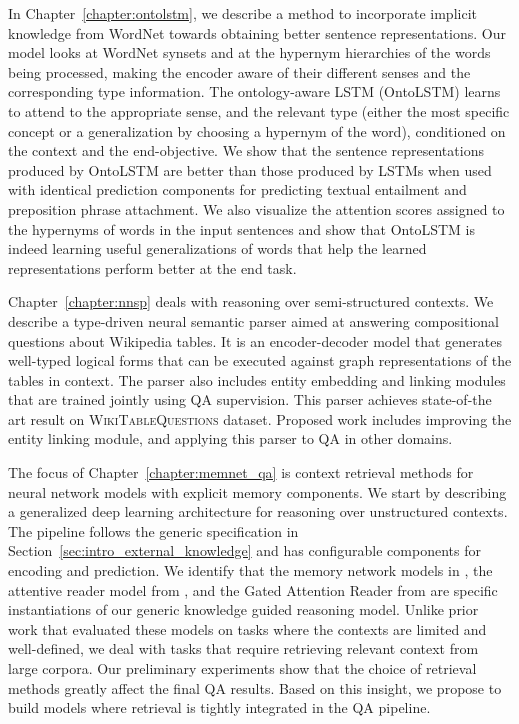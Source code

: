 In Chapter~\ref{chapter:ontolstm}, we describe a method to incorporate implicit knowledge
from WordNet towards obtaining better sentence representations. Our model looks at WordNet synsets
and at the hypernym hierarchies of the words being processed, making the 
encoder aware of their different senses and the corresponding type information.
The ontology-aware LSTM (OntoLSTM) learns to attend to the appropriate sense,
and the relevant type 
(either the most specific concept or a generalization by choosing a hypernym of
the word), conditioned on the context and the end-objective. We show that the sentence representations 
produced by OntoLSTM are better than those produced by LSTMs when used with identical prediction 
components for predicting textual entailment and preposition phrase attachment. We also visualize the attention scores assigned to the hypernyms 
of words in the input sentences and show that OntoLSTM is indeed learning useful generalizations of words
that help the learned representations perform better at the end task.

Chapter~\ref{chapter:nnsp} deals with reasoning over semi-structured contexts. We describe a type-driven
neural semantic parser aimed at answering compositional questions about Wikipedia tables. It is an encoder-decoder model that generates
well-typed logical forms that can be executed against graph representations of the tables in context. The parser also includes entity embedding
and linking modules that are trained jointly using QA supervision. This parser achieves state-of-the art result on \textsc{WikiTableQuestions} dataset.
Proposed work includes improving the entity linking module, and applying this parser to QA in other domains.

The focus of Chapter~\ref{chapter:memnet_qa} is context retrieval methods for neural network models with explicit memory components.
We start by describing a generalized deep learning architecture for reasoning over unstructured contexts. The pipeline follows the generic
specification in Section~\ref{sec:intro_external_knowledge} and has configurable components
for encoding and prediction. We identify that the memory network models in \cite{weston2014memory,Sukhbaatar2015EndToEndMN,Xiong2016DynamicMN},
the attentive reader model from \cite{hermann2015teaching}, and the Gated Attention Reader from \cite{dhingra2016gated} are specific instantiations
of our generic knowledge guided reasoning model.
Unlike prior work that evaluated these models on tasks where the contexts are limited and well-defined, we deal with tasks that require
retrieving relevant context from large corpora. Our preliminary experiments show that the choice of retrieval methods greatly affect the
final QA results. Based on this insight, we propose to build models where retrieval is tightly integrated in the QA pipeline.

